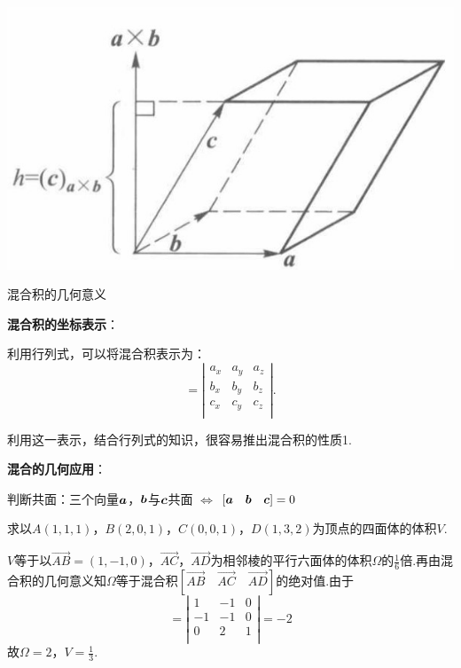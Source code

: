 \begin{marginfigure}[7em]
	\includegraphics[width=\marginparwidth]{figures/mixed-product.jpg}
	\caption{混合积的几何意义}
	\label{fig:mixedproduct}
\end{marginfigure}

\par \textbf{混合积的坐标表示}：
\par 利用行列式，可以将混合积表示为：
\begin{equation}
  [\vb*{a} \quad \vb*{b} \quad \vb*{c}] =
  \left |\begin{array}{ccc}
    a_x & a_y & a_z \\
    b_x & b_y & b_z \\
    c_x & c_y & c_z \\
  \end{array}\right |.
\end{equation}
\par 利用这一表示，结合行列式的知识，很容易推出混合积的性质1.

\par \textbf{混合的几何应用}：

判断共面：三个向量$\vb*{a}$，$\vb*{b}$与$\vb*{c}$共面 $\Leftrightarrow$ $[\vb*{a} \quad \vb*{b} \quad \vb*{c}]=0$

\begin{example}
  求以$A(1,1,1)$，$B(2,0,1)$，$C(0,0,1)$，$D(1,3,2)$为顶点的四面体的体积$V$.
\end{example}

\begin{solution}
  $V$等于以$\overrightarrow{AB}=(1,-1,0)$，$\overrightarrow{AC}$，$\overrightarrow{AD}$为相邻棱的平行六面体的体积$\Omega$的$\frac{1}{6}$倍.再由混合积的几何意义知$\Omega$等于混合积$[\overrightarrow{AB} \quad \overrightarrow{AC} \quad \overrightarrow{AD}]$的绝对值.由于
  \begin{equation*}
    [\overrightarrow{AB} \quad \overrightarrow{AC} \quad \overrightarrow{AD}]=
    \left |\begin{array}{ccc}
      1  & -1 & 0 \\
      -1 & -1 & 0 \\
      0  & 2  & 1 \\
    \end{array}\right |
    =-2
  \end{equation*}
  故$\Omega=2$，$V=\frac{1}{3}$.
\end{solution}

